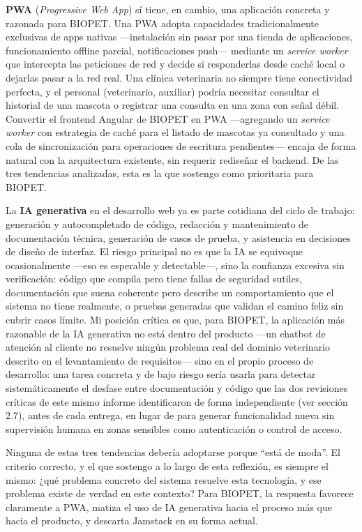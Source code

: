 \documentclass[11pt,a4paper]{article}
\begin{document}
\textbf{PWA} (\emph{Progressive Web App}) sí tiene, en cambio, una
aplicación concreta y razonada para BIOPET. Una PWA adopta capacidades
tradicionalmente exclusivas de apps nativas —instalación sin pasar por una
tienda de aplicaciones, funcionamiento offline parcial, notificaciones
push— mediante un \emph{service worker} que intercepta las peticiones de
red y decide si responderlas desde caché local o dejarlas pasar a la red
real. Una clínica veterinaria no siempre tiene conectividad perfecta, y el
personal (veterinario, auxiliar) podría necesitar consultar el historial de
una mascota o registrar una consulta en una zona con señal débil. Convertir
el frontend Angular de BIOPET en PWA —agregando un \emph{service worker}
con estrategia de caché para el listado de mascotas ya consultado y una
cola de sincronización para operaciones de escritura pendientes— encaja de
forma natural con la arquitectura existente, sin requerir rediseñar el
backend. De las tres tendencias analizadas, esta es la que sostengo como
prioritaria para BIOPET.

La \textbf{IA generativa} en el desarrollo web ya es parte cotidiana del
ciclo de trabajo: generación y autocompletado de código, redacción y
mantenimiento de documentación técnica, generación de casos de prueba, y
asistencia en decisiones de diseño de interfaz. El riesgo principal no es
que la IA se equivoque ocasionalmente —eso es esperable y detectable—, sino
la confianza excesiva sin verificación: código que compila pero tiene
fallas de seguridad sutiles, documentación que suena coherente pero
describe un comportamiento que el sistema no tiene realmente, o pruebas
generadas que validan el camino feliz sin cubrir casos límite. Mi posición
crítica es que, para BIOPET, la aplicación más razonable de la IA
generativa no está dentro del producto —un chatbot de atención al cliente
no resuelve ningún problema real del dominio veterinario descrito en el
levantamiento de requisitos— sino en el propio proceso de desarrollo: una
tarea concreta y de bajo riesgo sería usarla para detectar
sistemáticamente el desfase entre documentación y código que las dos
revisiones críticas de este mismo informe identificaron de forma
independiente (ver sección 2.7), antes de cada entrega, en lugar de para
generar funcionalidad nueva sin supervisión humana en zonas sensibles como
autenticación o control de acceso.

Ninguna de estas tres tendencias debería adoptarse porque ``está de
moda''. El criterio correcto, y el que sostengo a lo largo de esta
reflexión, es siempre el mismo: ¿qué problema concreto del sistema resuelve
esta tecnología, y ese problema existe de verdad en este contexto? Para
BIOPET, la respuesta favorece claramente a PWA, matiza el uso de IA
generativa hacia el proceso más que hacia el producto, y descarta Jamstack
en su forma actual.
\end{document}
